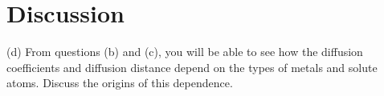 \newpage
\section{Discussion}

(d) From questions (b) and (c), you will be able to see how the diffusion coefficients and diffusion distance depend on the types of metals and solute atoms. Discuss the origins of this dependence.
